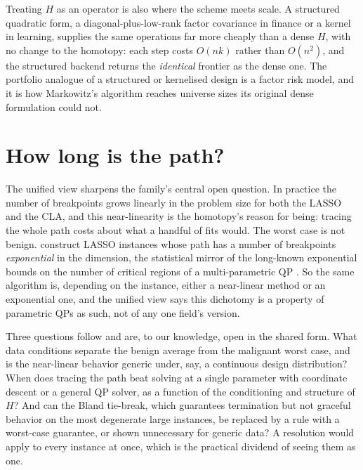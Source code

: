 \documentclass[sts]{imsart}
\theoremstyle{plain}
\theoremstyle{definition}
\begin{document}
Treating $H$ as an operator is also where the scheme meets scale. A structured
quadratic form, a diagonal-plus-low-rank factor covariance in finance or a kernel in
learning, supplies the same operations far more cheaply than a dense $H$, with no
change to the homotopy: each step costs $O(nk)$ rather than $O(n^2)$, and the structured
backend returns the \emph{identical} frontier as the dense one. The portfolio analogue
of a structured or kernelised design is a factor risk model, and it is how Markowitz's
algorithm reaches universe sizes its original dense formulation could not.

\section{How long is the path?}
\label{sec:length}

The unified view sharpens the family's central open question. In practice the number
of breakpoints grows linearly in the problem size for both the LASSO and the CLA, and
this near-linearity is the homotopy's reason for being: tracing the whole path costs
about what a handful of fits would. The worst case is not benign.
\citet{mairal2012} construct LASSO instances whose path has a number of breakpoints
\emph{exponential} in the dimension, the statistical mirror of the long-known
exponential bounds on the number of critical regions of a multi-parametric QP
\citep{tondel2003}. So the same algorithm is, depending on the instance, either a
near-linear method or an exponential one, and the unified view says this dichotomy is a
property of parametric QPs as such, not of any one field's version.

Three questions follow and are, to our knowledge, open in the shared form. What data
conditions separate the benign average from the malignant worst case, and is the
near-linear behavior generic under, say, a continuous design distribution? When does
tracing the path beat solving at a single parameter with coordinate descent or a
general QP solver, as a function of the conditioning and structure of $H$? And can the
Bland tie-break, which guarantees termination but not graceful behavior on the most
degenerate large instances, be replaced by a rule with a worst-case guarantee, or shown
unnecessary for generic data? A resolution would apply to every instance at once,
which is the practical dividend of seeing them as one.
\end{document}
